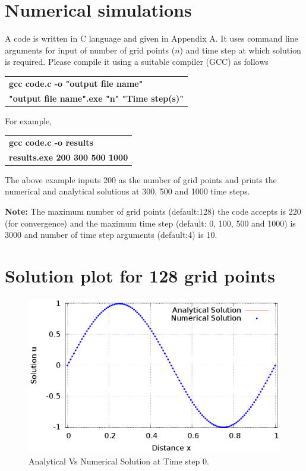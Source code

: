 \documentclass[12pt]{article}
\begin{document}
	\section{Numerical simulations}
	
	A code is written in C language and given in Appendix A. It uses command line arguments for input of number of grid points ($n$) and time step at which solution is required. Please compile it using a suitable compiler (GCC) as follows	
	\begin{center}
		\begin{tabular}{l}
			\textbf{gcc code.c -o "output file name"} \\
			\textbf{"output file name".exe "n" "Time step(s)"}
		\end{tabular}
	\end{center}
	
	For example,
	
	\begin{center}
		\begin{tabular}{l}
			\textbf{gcc code.c -o results} \\
			\textbf{results.exe 200 300 500 1000}
		\end{tabular}
	\end{center}
	
	The above example inputs 200 as the number of grid points and prints the numerical and analytical solutions at 300, 500 and 1000 time steps. 
	
	\textbf{Note:} The maximum number of grid points (default:128) the code accepts is 220 (for convergence) and the maximum time step (default: 0, 100, 500 and 1000) is 3000 and number of time step arguments (default:4) is 10.
	
	\newpage
	
	\section{Solution plot for 128 grid points}
	
	\begin{figure}[H]
		\centering
		\includegraphics[scale=1]{"Gnuplot/NSvsAS_0_plot_for_128_grid_points.eps"}
		\caption{Analytical Vs Numerical Solution at Time step 0.}	
	\end{figure}
	
\end{document}
